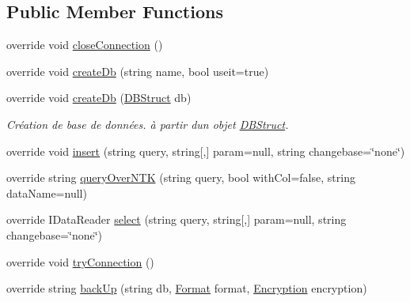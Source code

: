 \subsection*{Public Member Functions}
\begin{DoxyCompactItemize}
\item 
override void \mbox{\hyperlink{class_n_t_k_1_1_database_1_1_n_t_k_d___sql_server_ad5f62cdabc17dcdf224b2ff49ce07fa6}{close\+Connection}} ()
\item 
override void \mbox{\hyperlink{class_n_t_k_1_1_database_1_1_n_t_k_d___sql_server_a18d6c1adb757f7a322ec0ce99ca1fe6c}{create\+Db}} (string name, bool useit=true)
\item 
override void \mbox{\hyperlink{class_n_t_k_1_1_database_1_1_n_t_k_d___sql_server_a83c90561641f4460734261ce67bbdd53}{create\+Db}} (\mbox{\hyperlink{class_n_t_k_1_1_database_1_1_d_b_struct}{D\+B\+Struct}} db)
\begin{DoxyCompactList}\small\item\em Création de base de données. à partir d\textquotesingle{}un objet \mbox{\hyperlink{class_n_t_k_1_1_database_1_1_d_b_struct}{D\+B\+Struct}}. \end{DoxyCompactList}\item 
override void \mbox{\hyperlink{class_n_t_k_1_1_database_1_1_n_t_k_d___sql_server_ae98329c8db3207bc0f68106ee5e817b9}{insert}} (string query, string\mbox{[},\mbox{]} param=null, string changebase=\char`\"{}none\char`\"{})
\item 
override string \mbox{\hyperlink{class_n_t_k_1_1_database_1_1_n_t_k_d___sql_server_a86c2623990b3514fd01d4bced7e81e34}{query\+Over\+N\+TK}} (string query, bool with\+Col=false, string data\+Name=null)
\item 
override I\+Data\+Reader \mbox{\hyperlink{class_n_t_k_1_1_database_1_1_n_t_k_d___sql_server_ac78659791b01d0d3a8fbcdadf655b6a5}{select}} (string query, string\mbox{[},\mbox{]} param=null, string changebase=\char`\"{}none\char`\"{})
\item 
override void \mbox{\hyperlink{class_n_t_k_1_1_database_1_1_n_t_k_d___sql_server_a9ea0858ec61e56a805a99c3a6948a122}{try\+Connection}} ()
\item 
override string \mbox{\hyperlink{class_n_t_k_1_1_database_1_1_n_t_k_d___sql_server_a33a2db6bcd7c390fedc28472a672f8b4}{back\+Up}} (string db, \mbox{\hyperlink{namespace_n_t_k_1_1_database_a9bed700210ca4ed5854002637b664789}{Format}} format, \mbox{\hyperlink{namespace_n_t_k_1_1_database_aa21afe93187a6c77c4ccdc988b3c4ac2}{Encryption}} encryption)
\item 

\end{DoxyCompactItemize}
